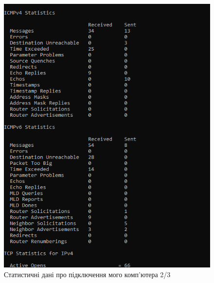 \documentclass{article}
\begin{document}
\begin{normalsize}
\begin{figure}[H]
	\centering
	\includegraphics[width=\textwidth]{52}
	\caption{Статистичні дані про підключення
		мого комп'ютера 2/3}
\end{figure}


\end{normalsize}
\end{document}
